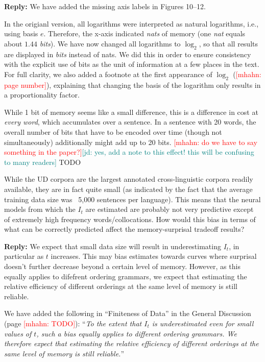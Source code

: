 \documentclass{article}[11pt,a4paper,oneside]
\newcommand\mhahn[1]{\textcolor{red}{[mhahn: #1]}}
\newcommand\jd[1]{\textcolor{teal}{[jd: #1]}}
\newenvironment{reply}
  {\par\medskip
   \color{blue}%
   \begin{framed}
   \textbf{Reply: }\ignorespaces}
 {\end{framed}
  \medskip}
\begin{document}
\begin{reply}
We have added the missing axis labels in Figures 10--12.

In the origianl version, all logarithms were interpreted as natural logarithms, i.e., using basis $e$. Therefore, the x-axis indicated \emph{nats} of memory (one \emph{nat} equals about $1.44$ \emph{bits}).
	We have now changed all logarithms to $\log_2$, so that all results are displayed in \emph{bits} instead of nats.
	We did this in order to ensure consistency with the explicit use of bits as the unit of information at a few places in the text.
	For full clarity, we also added a footnote at the first appearance of $\log_2$ (\mhahn{page number}), explaining that changing the basis of the logarithm only results in a proportionality factor.

	While 1 bit of memory seems like a small difference, this is a difference in cost at \emph{every word}, which accumulates over a sentence.
	In a sentence with 20 words, the overall number of bits that have to be encoded over time (though not simultaneously) additionally might add up to 20 bits.
	\mhahn{do we have to say something in the paper?}\jd{yes, add a note to this effect! this will be confusing to many readers} TODO
\end{reply}

While the UD corpora are the largest annotated cross-linguistic corpora readily available, they are in fact quite small (as indicated by the fact that the average training data size was ~5,000 sentences per language). This means that the neural models from which the $I_t$ are estimated are probably not very predictive except of extremely high frequency words/collocations. How would this bias in terms of what can be correctly predicted affect the memory-surprisal tradeoff results?

\begin{reply}
	We expect that small data size will result in underestimating $I_t$, in particular as $t$ increases. This may bias estimates towards curves where surprisal doesn't further decrease beyond a certain level of memory.
However, as this equally applies to difefrent ordering grammars, we expect that estimating the relative efficiency of different orderings at the same level of memory is still reliable.

	We have added the following in ``Finiteness of Data'' in the General Discussion (page \mhahn{TODO}):
	``\textit{To the extent that $I_t$ is underestimated even for small values of $t$, such a bias equally applies to different ordering grammars. We therefore expect that estimating the relative efficiency of different orderings at the same level of memory is still reliable.}''
\end{reply}
\end{document}
